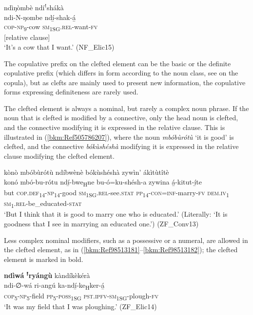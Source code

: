 \ea
\label{bkm:Ref449691735}
ndìŋòmbè ndíꜝshákà\\
\glll ndi-N-ŋombe  ndí̲-shak-á̲\\
\textsc{cop}-\textsc{np}\textsubscript{9}-cow  \textsc{sm}\textsubscript{1SG}.\textsc{rel}-want-\textsc{fv}\\
[{clefted element}] [{relative clause}]\\
\glt ‘It’s a cow that I want.’ (NF\_Elic15)
\z

The copulative prefix on the clefted element can be the basic or the definite copulative prefix (which differs in form according to the noun class, see  on the copula), but as clefts are mainly used to present new information, the copulative forms expressing definiteness are rarely used.

The clefted element is always a nominal, but rarely a complex noun phrase. If the noun that is clefted is modified by a connective, only the head noun is clefted, and the connective modifying it is expressed in the relative clause. This is illustrated in (\ref{bkm:Ref505786207}), where the noun \textit{mbóbùrótù} ‘it is good’ is clefted, and the connective \textit{bókùshéshà} modifying it is expressed in the relative clause modifying the clefted element.

\newpage
\ea
\label{bkm:Ref505786207}
kònò mbóbùrótù ndíbwènè bókùshéshà zywìn’ ákìtùtîtè\\
\gll konó  mbó-bu-rótu      ndí̲-bwe\textsubscript{H}ne bu-ó=ku-shésh-a    zywina  á̲-kitut-í̲te\\
but  \textsc{cop}.\textsc{def}\textsubscript{14}-\textsc{np}\textsubscript{14}-good  \textsc{sm}\textsubscript{1SG}.\textsc{rel}-see.\textsc{stat}
\textsc{pp}\textsubscript{14}-\textsc{con}=\textsc{inf}-marry-\textsc{fv}  \textsc{dem}.\textsc{iv}\textsubscript{1}  \textsc{sm}\textsubscript{1}.\textsc{rel}-be\_educated-\textsc{stat}\\
\glt ‘But I think that it is good to marry one who is educated.’ (Literally: ‘It is goodness that I see in marrying an educated one.’) (ZF\_Conv13)
\z

Less complex nominal modifiers, such as a possessive or a numeral, are allowed in the clefted element, as in (\ref{bkm:Ref98513181}--\ref{bkm:Ref98513182}); the clefted element is marked in bold.

\ea
\label{bkm:Ref98513181}
\textbf{ndìwá} \textbf{ꜝ}\textbf{ryángù} kàndíkèkérà\\
\gll ndi-∅-wá    ri-angú  ka-ndí̲-ke\textsubscript{H}ker-á̲\\
\textsc{cop}\textsubscript{5}-\textsc{np}\textsubscript{5}-field  \textsc{pp}\textsubscript{5}-\textsc{poss}\textsubscript{1SG}  \textsc{pst}.\textsc{ipfv}-\textsc{sm}\textsubscript{1SG}-plough-\textsc{fv}\\
\glt ‘It was my field that I was ploughing.’ (ZF\_Elic14)
\z

